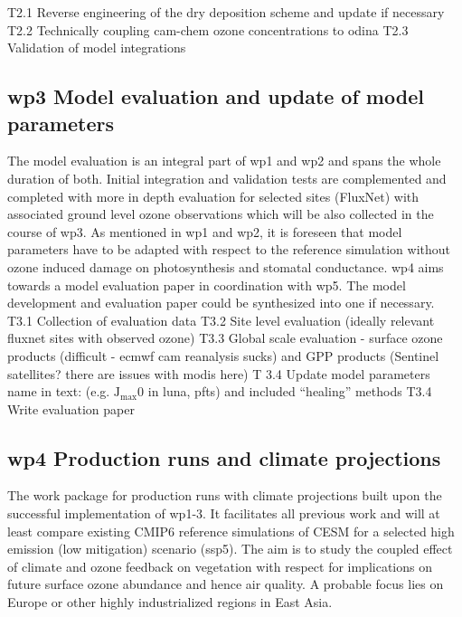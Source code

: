 T2.1 Reverse engineering of the dry deposition scheme and update if necessary 
T2.2 Technically coupling \gls{cam}-chem ozone concentrations to \gls{odina}
T2.3 Validation of model integrations

\subsection*{\gls{wp}3 Model evaluation and update of model parameters}
\label{ssec:wp3}
The model evaluation is an integral part of \gls{wp}1 and \gls{wp}2 and spans the whole duration of both. Initial integration and validation tests are complemented and completed with more in depth evaluation for selected sites (FluxNet) with associated ground level ozone observations which will be also collected in the course of \gls{wp}3. As mentioned in \gls{wp}1 and \gls{wp}2, it is foreseen that model parameters have to be adapted with respect to the reference simulation without ozone induced damage on photosynthesis and stomatal conductance. \gls{wp}4 aims towards a model evaluation paper in coordination with \gls{wp}5. The model development and evaluation paper could be synthesized into one if necessary.\\

T3.1 Collection of evaluation data 
T3.2 Site level evaluation (ideally relevant fluxnet sites with observed ozone)
T3.3 Global scale evaluation - surface ozone products (difficult - \gls{ecmwf} \gls{cam} reanalysis sucks) and GPP products (Sentinel satellites? there are issues with \gls{modis} here)
T 3.4 Update model parameters 
name in text: (e.g. $\mathrm{J_{max}}$0 in \gls{luna}, \glspl{pft}) and included “healing” methods
T3.4 Write evaluation paper

\subsection*{\gls{wp}4 Production runs and climate projections}
\label{ssec:wp4}
The work package for production runs with climate projections built upon the successful implementation of \gls{wp}1-3. It facilitates all previous work and will at least compare existing CMIP6 reference simulations of CESM for a selected high emission (low mitigation) scenario (\gls{ssp}5). The aim is to study the coupled effect of climate and ozone feedback on vegetation with respect for implications on future surface ozone abundance and hence air quality. A probable focus lies on Europe or other highly industrialized regions in East Asia.\\
 
